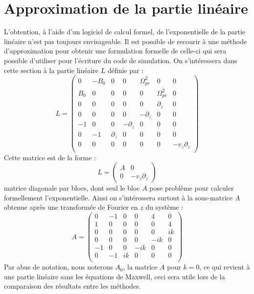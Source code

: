 
\section{Approximation de la partie linéaire}
\label{s3:approx}

L'obtention, à l'aide d'un logiciel de calcul formel, de l'exponentielle de la partie linéaire n'est pas toujours envisageable. Il est possible de recourir à une méthode d'approximation pour obtenir une formulation formelle de celle-ci qui sera possible d'utiliser pour l'écriture du code de simulation. On s'intéressera dans cette section à la partie linéaire $L$ définie par :
$$
  L = \begin{pmatrix}
    0   & -B_0 & 0          &  0          &  \Omega_{pe}^2 & 0             & 0 \\
    B_0 &  0   & 0          &  0          &  0             & \Omega_{pe}^2 & 0 \\
    0   &  0   & 0          &  0          &  0             & \partial_z    & 0 \\
    0   &  0   & 0          &  0          & -\partial_z    & 0             & 0 \\
   -1   &  0   & 0          & -\partial_z &  0             & 0             & 0 \\
    0   & -1   & \partial_z &  0          &  0             & 0             & 0 \\
    0   &  0   & 0          &  0          &  0             & 0             & -v_z\partial_z \\
  \end{pmatrix}
$$
Cette matrice est de la forme :
$$
  L = \begin{pmatrix}
    A & 0 \\
    0 & -v_z\partial_z
  \end{pmatrix}
$$
matrice diagonale par blocs, dont seul le bloc $A$ pose problème pour calculer formellement l'exponentielle. Ainsi on s'intéressera surtout à la sous-matrice $A$ obtenue après une transformée de Fourier en $z$ du système :
$$
  A = \begin{pmatrix}
    0 & -1 & 0  &  0  &  4  & 0  \\
    1 &  0 & 0  &  0  &  0  & 4  \\
    0 &  0 & 0  &  0  &  0  & ik \\
    0 &  0 & 0  &  0  & -ik & 0  \\
   -1 &  0 & 0  & -ik &  0  & 0  \\
    0 & -1 & ik &  0  &  0  & 0  \\
  \end{pmatrix}
$$
Par abus de notation, nous noterons $A_0$, la matrice $A$ pour $k=0$, ce qui revient à une partie linéaire sans les équations de Maxwell, ceci sera utile lors de la comparaison des résultats entre les méthodes.


